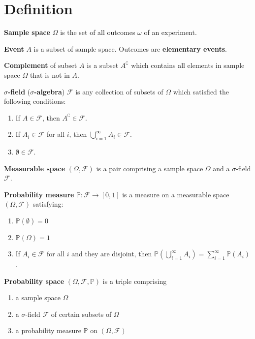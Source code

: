 \documentclass{huhtakm-template-book}
\newcommand{\prob}{\mathbb{P}}
\begin{document}
\section*{Definition}
    \begin{sdefn}
        \textbf{Sample space} $\Omega$ is the set of all outcomes $\omega$ of an experiment.
    \end{sdefn}
    \begin{sdefn}
        \textbf{Event} $A$ is a subset of sample space. Outcomes are \textbf{elementary events}.
    \end{sdefn}
    \begin{sdefn}
        \textbf{Complement} of subset $A$ is a subset $A^{\complement}$ which contains all elements in sample space $\Omega$ that is not in $A$.
    \end{sdefn}
    \begin{sdefn}
        \textbf{$\sigma$-field} (\textbf{$\sigma$-algebra}) $\mathcal{F}$ is any collection of subsets of $\Omega$ which satisfied the following conditions:
        \begin{enumerate}
            \item If $A\in\mathcal{F}$, then $A^{\complement}\in\mathcal{F}$.
            \item If $A_{i}\in\mathcal{F}$ for all $i$, then $\bigcup_{i=1}^{\infty}A_{i}\in\mathcal{F}$.
            \item $\emptyset\in\mathcal{F}$.
        \end{enumerate}
    \end{sdefn}
    \begin{sdefn}
        \textbf{Measurable space} $(\Omega,\mathcal{F})$ is a pair comprising a sample space $\Omega$ and a $\sigma$-field $\mathcal{F}$.
    \end{sdefn}
    \begin{sdefn}
        \textbf{Probability measure} $\prob:\mathcal{F}\to[0,1]$ is a measure on a measurable space $(\Omega,\mathcal{F})$ satisfying:
        \begin{enumerate}
            \item $\prob(\emptyset)=0$
            \item $\prob(\Omega)=1$
            \item If $A_{i}\in\mathcal{F}$ for all $i$ and they are disjoint, then $\prob(\bigcup_{i=1}^{\infty}A_{i})=\sum_{i=1}^{\infty}\prob(A_{i})$.
        \end{enumerate}
    \end{sdefn}
    \begin{sdefn}
        \textbf{Probability space} $(\Omega,\mathcal{F},\prob)$ is a triple comprising 
        \begin{enumerate}
        	\item a sample space $\Omega$
        	\item a $\sigma$-field $\mathcal{F}$ of certain subsets of $\Omega$
        	\item a probability measure $\prob$ on $(\Omega,\mathcal{F})$
        \end{enumerate}
    \end{sdefn}
\end{document}
